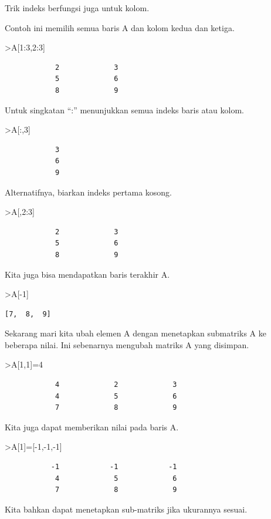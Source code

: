 \documentclass[
]{book}
\begin{document}
Trik indeks berfungsi juga untuk kolom.

Contoh ini memilih semua baris A dan kolom kedua dan ketiga.

\textgreater A{[}1:3,2:3{]}

\begin{verbatim}
            2             3 
            5             6 
            8             9 
\end{verbatim}

Untuk singkatan ``:'' menunjukkan semua indeks baris atau kolom.

\textgreater A{[}:,3{]}

\begin{verbatim}
            3 
            6 
            9 
\end{verbatim}

Alternatifnya, biarkan indeks pertama kosong.

\textgreater A{[},2:3{]}

\begin{verbatim}
            2             3 
            5             6 
            8             9 
\end{verbatim}

Kita juga bisa mendapatkan baris terakhir A.

\textgreater A{[}-1{]}

\begin{verbatim}
[7,  8,  9]
\end{verbatim}

Sekarang mari kita ubah elemen A dengan menetapkan submatriks A ke beberapa nilai. Ini sebenarnya mengubah matriks A yang disimpan.

\textgreater A{[}1,1{]}=4

\begin{verbatim}
            4             2             3 
            4             5             6 
            7             8             9 
\end{verbatim}

Kita juga dapat memberikan nilai pada baris A.

\textgreater A{[}1{]}={[}-1,-1,-1{]}

\begin{verbatim}
           -1            -1            -1 
            4             5             6 
            7             8             9 
\end{verbatim}

Kita bahkan dapat menetapkan sub-matriks jika ukurannya sesuai.
\end{document}
